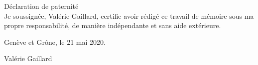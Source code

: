 
\begin{titlepage}
 \begin{center}
    \Large
    Déclaration de paternité\\





 Je soussignée, Valérie Gaillard, certifie avoir rédigé ce travail de mémoire sous ma propre responsabilité, de manière indépendante et sans aide extérieure.




 \vfill

 Genève et Grône, le 21 mai 2020.


 Valérie Gaillard




	 \hfill \\
	 \rule{0mm}{0.5pt} \hfill
 \end{center}
\end{titlepage}
